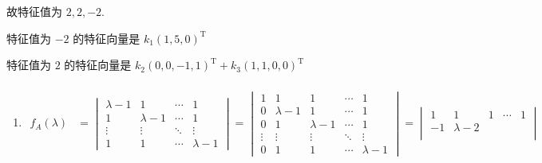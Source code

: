 \begin{enumerate}
                   故特征值为 \( 2, 2, -2 \).

                   特征值为 \( -2 \) 的特征向量是 \( k_{1}(1, 5, 0)^{\mathrm{T}} \)

                   特征值为 \( 2 \) 的特征向量是 \( k_{2}(0, 0, -1, 1)^{\mathrm{T}} + k_{3}(1, 1, 0, 0)^{\mathrm{T}} \)
         \end{enumerate}


     \paragraph{} %
         \begin{enumerate}
             \item %
                   \begin{align*}
                       f_{A}(\lambda)
                        & = \begin{vmatrix}
                                \lambda - 1 & 1           & \cdots & 1           \\
                                1           & \lambda - 1 & \cdots & 1           \\
                                \vdots      & \vdots      & \ddots & \vdots      \\
                                1           & 1           & \cdots & \lambda - 1
                            \end{vmatrix} = \begin{vmatrix}
                                                1      & 1           & 1           & \cdots & 1           \\
                                                0      & \lambda - 1 & 1           & \cdots & 1           \\
                                                0      & 1           & \lambda - 1 & \cdots & 1           \\
                                                \vdots & \vdots      & \vdots      & \ddots & \vdots      \\
                                                0      & 1           & 1           & \cdots & \lambda - 1
                                            \end{vmatrix} = \begin{vmatrix}
                                                                1      & 1         & 1         & \cdots & 1         \\
                                                                -1     & \lambda-2 &           &        &           \\

\end{vmatrix}
\end{align*}
\end{enumerate}
